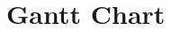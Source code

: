 \documentclass[11pt]{article}
\begin{document}
{\begin{thebibliography}{9}
	

	
	
	

\end{thebibliography}



\vfill
\section*{Gantt Chart}

\begin{center}
\end{center}



}
\end{document}
